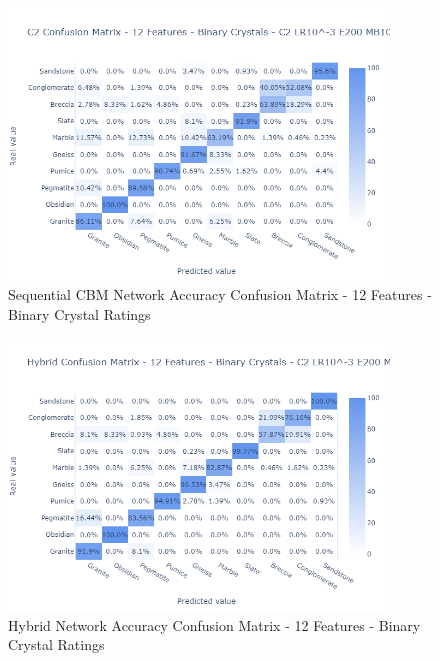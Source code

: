 \begin{figure}[H]
  \centering
    \includegraphics[width=0.9\textwidth, trim = 0cm 0cm 0.5cm 3.5cm, clip]{images/C2 Confusion Matrix - 12 Features - Binary Crystals.png}
    \caption{Sequential CBM Network Accuracy Confusion Matrix - 12 Features - Binary Crystal Ratings} \label{fig:Sequential CBM Network Accuracy Confusion Matrix - 12 Features - Binary Crystal Ratings}
\end{figure}

\begin{figure}[H]
  \centering
    \includegraphics[width=0.9\textwidth, trim = 0cm 0cm 0.5cm 3.5cm, clip]{images/Hybrid Confusion Matrix - 12 Features - Binary Crystals.png }
    \caption{Hybrid Network Accuracy Confusion Matrix - 12 Features - Binary Crystal Ratings} \label{fig:Hybrid Network Accuracy Confusion Matrix- 12 Features - Binary Crystal Ratings}
\end{figure}

